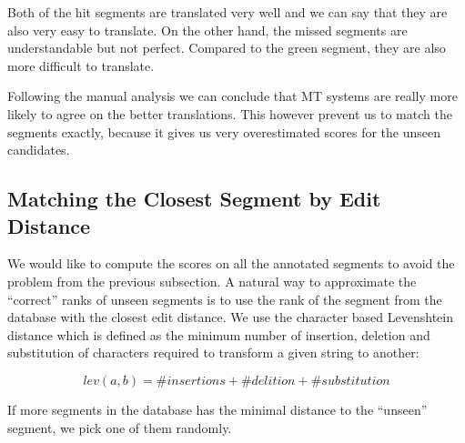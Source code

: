 \noindent Both of the hit segments are translated very well and we can say that
they are also very easy to translate. On the other hand, the missed segments
are understandable but not perfect. Compared to the green segment, they are
also more difficult to translate.

Following the manual analysis we can conclude that MT systems are really more
likely to agree on the better translations. This however prevent us to match
the segments exactly, because it gives us very overestimated scores for the
unseen candidates.

\subsection{Matching the Closest Segment by Edit Distance}

We would like to compute the scores on all the annotated segments to avoid the
problem from the previous subsection. A natural way to approximate the
``correct'' ranks of unseen segments is to use the rank of the segment from the
database with the closest edit distance. We use the character based Levenshtein
distance which is defined as the minimum number of insertion, deletion and
substitution of characters required to transform a given string to another:

\begin{equation*}
  lev(a,b) = \#insertions + \#delition + \#substitution
\end{equation*}

\noindent If more segments in the database has the minimal distance to the ``unseen'' 
segment, we pick one of them randomly.


